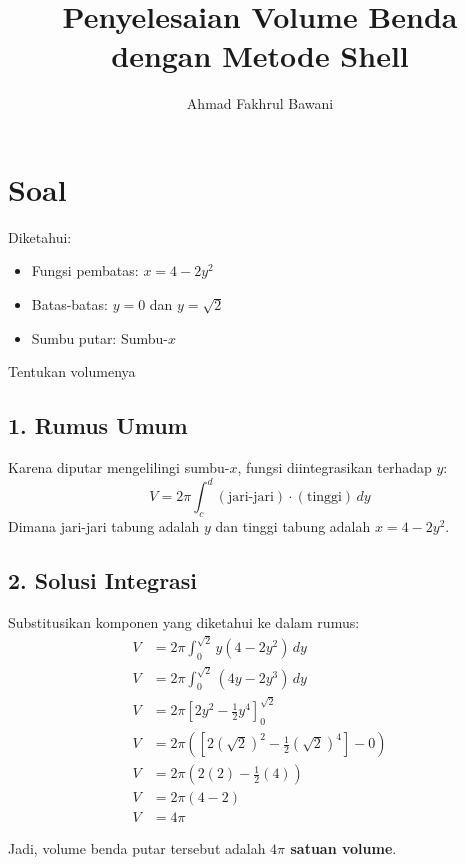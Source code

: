 \documentclass[12pt,a4paper]{article}
\title{Penyelesaian Volume Benda dengan Metode Shell}
\author{Ahmad Fakhrul Bawani}
\date{}
\begin{document}
\maketitle

\section*{Soal}

Diketahui:
\begin{itemize}
  \item Fungsi pembatas: $x = 4 - 2y^2$
  \item Batas-batas: $y = 0$ dan $y = \sqrt{2}$
  \item Sumbu putar: Sumbu-$x$
\end{itemize}
Tentukan volumenya

\subsection*{1. Rumus Umum}
Karena diputar mengelilingi sumbu-$x$, fungsi diintegrasikan terhadap $y$:
\begin{equation*}
  V = 2\pi \int_{c}^{d} (\text{jari-jari}) \cdot (\text{tinggi}) \, dy
\end{equation*}
Dimana jari-jari tabung adalah $y$ dan tinggi tabung adalah $x = 4 - 2y^2$.

\subsection*{2. Solusi Integrasi}
Substitusikan komponen yang diketahui ke dalam rumus:
\begin{align*}
  V &= 2\pi \int_{0}^{\sqrt{2}} y(4 - 2y^2) \, dy \\
  V &= 2\pi \int_{0}^{\sqrt{2}} (4y - 2y^3) \, dy \\
  V &= 2\pi \left[ 2y^2 - \frac{1}{2}y^4 \right]_{0}^{\sqrt{2}} \\
  V &= 2\pi \left( \left[ 2(\sqrt{2})^2 - \frac{1}{2}(\sqrt{2})^4 \right] - 0 \right) \\
  V &= 2\pi \left( 2(2) - \frac{1}{2}(4) \right) \\
  V &= 2\pi (4 - 2) \\
  V &= 4\pi
\end{align*}

Jadi, volume benda putar tersebut adalah \textbf{$4\pi$ satuan volume}.
\end{document}
